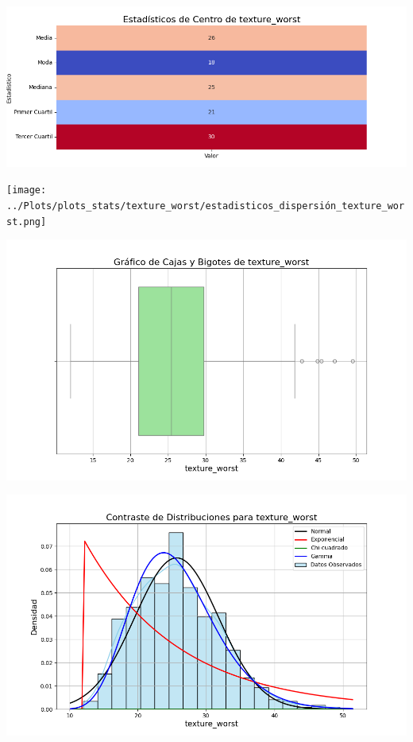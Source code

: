 \documentclass[a4paper, 12pt]{article}
\begin{document}
\includegraphics[width=\textwidth]{../Plots/plots_stats/texture_worst/estadisticas_centro_texture_worst.png}




\texttt{[image: ../Plots/plots\_stats/texture\_worst/estadisticos\_dispersión\_texture\_worst.png]}



\includegraphics[width=\textwidth]{../Plots/plots_stats/texture_worst/boxplot_texture_worst.png}




\includegraphics[width=\textwidth]{../Plots/plots_stats/texture_worst/distribuciones_conocidas_texture_worst.png}
\end{document}
